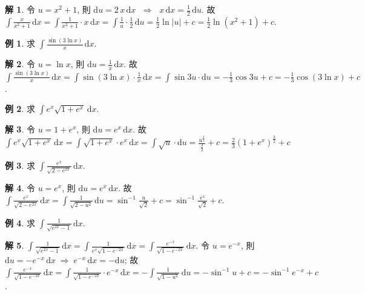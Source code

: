 \documentclass[12pt]{extarticle}
\newcommand{\ds}{\displaystyle}
\newcommand{\ie}{\;\Longrightarrow\;}
\theoremstyle{definition}
\newtheorem*{ex}{例}
\newtheorem*{sol}{解}
\begin{document}
\begin{sol}
  令 $\ds u = x^2 + 1$, 則 $\ds\text{d}u = 2\,x\,\text{d}x$ $\ie$ $\ds x\,\text{d}x=\frac{1}{2}\,\text{d}u$. 故 $\ds\int\!\frac{x}{x^2+1}\,\text{d}x = \int\!\frac{1}{x^2+1}\cdot x\,\text{d}x = \int\!\frac{1}{u}\cdot\frac{1}{2}\,\text{d}u = \frac{1}{2}\ln|u| + c = \frac{1}{2}\ln(x^2 + 1) + c$. 
\end{sol}
    
\begin{ex}
  求 $\ds\int\!\frac{\sin(3\ln x)}{x}\,\text{d}x$. 
\end{ex}

\begin{sol}
  令 $\ds u = \ln x$, 則 $\ds\text{d}u = \frac{1}{x}\,\text{d}x$. 故 $\ds\int\!\frac{\sin(3\ln x)}{x}\,\text{d}x = \int\!\sin(3\ln x)\cdot\frac{1}{x}\,\text{d}x = \int\!\sin3u\cdot\text{d}u = -\frac{1}{3}\cos 3u + c = -\frac{1}{3}\cos(3\ln x) + c$.  
\end{sol}

\begin{ex}
  求 $\ds\int\!e^x\sqrt{1 + e^x}\,\text{d}x$. 
\end{ex}

\begin{sol}
  令 $u = 1 + e^x$, 則 $\ds\text{d}u = e^x\,\text{d}x$. 故 $\ds\int\!e^x\sqrt{1 + e^x}\,\text{d}x = \int\!\sqrt{1 + e^x}\cdot e^x\,\text{d}x = \int\!\sqrt{u}\cdot\text{d}u = \frac{u^{\frac{3}{2}}}{\frac{3}{2}} + c = \frac{2}{3}(1 + e^x)^{\frac{3}{2}} + c$
\end{sol}

\begin{ex}
  求 $\ds\int\!\!\frac{e^x}{\sqrt{2 - e^{2x}}}\,\text{d}x$. 
\end{ex}

\begin{sol}
  令 $u = e^x$, 則 $\ds\text{d}u = e^x\,\text{d}x$. 故 $\ds\int\!\!\frac{e^x}{\sqrt{2 - e^{2x}}}\,\text{d}x = \int\!\!\frac{1}{\sqrt{2-u^2}}\,\text{d}u = \sin^{-1}\frac{u}{\sqrt{2}} + c = \sin^{-1}\frac{e^x}{\sqrt{2}} + c$. 
\end{sol}

\begin{ex}
  求 $\ds\int\!\!\frac{1}{\sqrt{e^{2x}-1}}\,\text{d}x$. 
\end{ex}

\begin{sol}
  $\ds\int\!\!\frac{1}{\sqrt{e^{2x}-1}}\,\text{d}x = \int\!\!\frac{1}{e^x\sqrt{1 - e^{-2x}}}\,\text{d}x = \int\!\!\frac{e^{-x}}{\sqrt{1 - e^{-2x}}}\,\text{d}x$. 令 $\ds u = e^{-x}$, 則 $\ds\text{d}u = -e^{-x}\,\text{d}x \ie e^{-x}\,\text{d}x = -\text{d}u$; 故 $\ds\int\!\!\frac{e^{-x}}{\sqrt{1 - e^{-2x}}}\,\text{d}x = \int\!\!\frac{1}{\sqrt{1 - e^{-2x}}}\cdot e^{-x}\,\text{d}x = -\int\!\!\frac{1}{\sqrt{1 - u^2}}\,\text{d}u = -\sin^{-1} u + c = -\sin^{-1} e^{-x} + c$. 
\end{sol}
\end{document}
